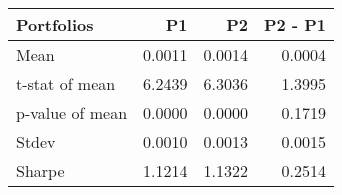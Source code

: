 \begin{tabular}{lrrr}
\toprule
Portfolios & P1 & P2 & P2 - P1 \\
\midrule
Mean & 0.0011 & 0.0014 & 0.0004 \\
t-stat of mean & 6.2439 & 6.3036 & 1.3995 \\
p-value of mean & 0.0000 & 0.0000 & 0.1719 \\
Stdev & 0.0010 & 0.0013 & 0.0015 \\
Sharpe & 1.1214 & 1.1322 & 0.2514 \\
\bottomrule
\end{tabular}
